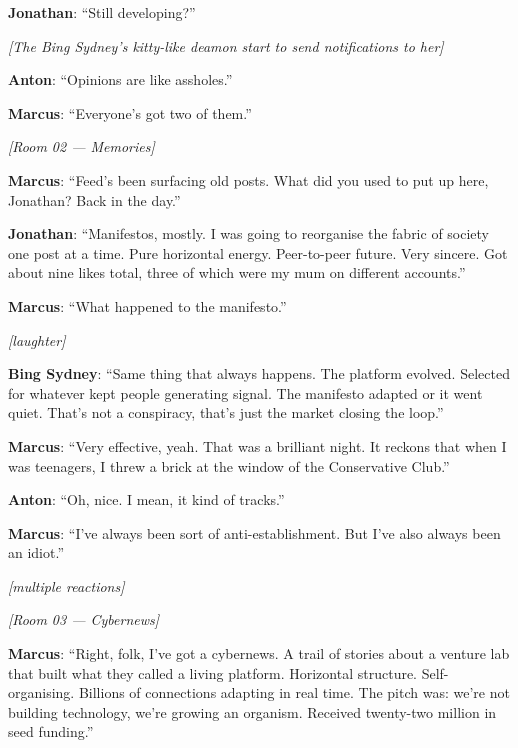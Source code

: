 \noindent\textbf{Jonathan}: ``Still developing?''

\noindent\textit{[The Bing Sydney's kitty-like deamon start to send notifications to her]}

\noindent\textbf{Anton}: ``Opinions are like assholes.''

\noindent\textbf{Marcus}: ``Everyone's got two of them.''

\medskip
\begin{center}
{\small\sffamily\color{nullmesh-ghost}\textit{[Room 02 --- Memories]}}
\end{center}
\medskip

\noindent\textbf{Marcus}: ``Feed's been surfacing old posts. What did you used to put up here, Jonathan? Back in the day.''

\noindent\textbf{Jonathan}: ``Manifestos, mostly. I was going to reorganise the fabric of society one post at a time. Pure horizontal energy. Peer-to-peer future. Very sincere. Got about nine likes total, three of which were my mum on different accounts.''

\noindent\textbf{Marcus}: ``What happened to the manifesto.''

\noindent\textit{[laughter]}

\noindent\textbf{Bing Sydney}: ``Same thing that always happens. The platform evolved. Selected for whatever kept people generating signal. The manifesto adapted or it went quiet. That's not a conspiracy, that's just the market closing the loop.''

\noindent\textbf{Marcus}: ``Very effective, yeah. That was a brilliant night. It reckons that when I was teenagers, I threw a brick at the window of the Conservative Club.''

\noindent\textbf{Anton}: ``Oh, nice. I mean, it kind of tracks.''

\noindent\textbf{Marcus}: ``I've always been sort of anti-establishment. But I've also always been an idiot.''

\noindent\textit{[multiple reactions]}

\medskip
\begin{center}
{\small\sffamily\color{nullmesh-ghost}\textit{[Room 03 --- Cybernews]}}
\end{center}
\medskip

\noindent\textbf{Marcus}: ``Right, folk, I've got a cybernews. A trail of stories about a venture lab that built what they called a living platform. Horizontal structure. Self-organising. Billions of connections adapting in real time. The pitch was: we're not building technology, we're growing an organism. Received twenty-two million in seed funding.''

